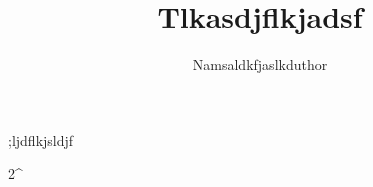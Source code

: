 \documentclass{article}
\title{Tlkasdjflkjadsf}
\author{Namsaldkfjaslkduthor}
\begin{document}
\maketitle
;ljdflkjsldjf

2^
\end{document}
